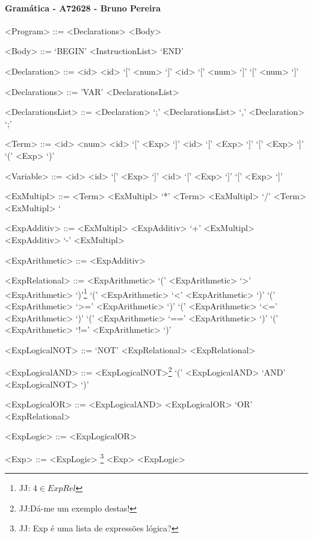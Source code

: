 \documentclass{article}
\begin{document}
\setlength{\grammarparsep}{20pt plus 1pt minus 1pt} %
\setlength{\grammarindent}{10em} %

\paragraph{Gramática - A72628 - Bruno Pereira}
\begin{grammar}

<Program> ::= <Declarations> <Body> 

<Body> ::= `BEGIN' <InstructionList> `END'

<Declaration> ::= <id>
\alt <id> `[' <num> `]'
\alt <id> `[' <num> `]' `[' <num> `]' 

<Declarations> ::= 'VAR' <DeclarationsList>  

<DeclarationsList> ::= <Declaration> `;'
\alt <DeclarationsList> `,' <Declaration> `;'

<Term> ::= <id>
\alt <num>
\alt <id> `[' <Exp> `]'
\alt <id> `[' <Exp> `]' `[' <Exp> `]'
\alt `(' <Exp> `)'

<Variable> ::= <id>
\alt <id> `[' <Exp> `]'
\alt <id> `[' <Exp> `]' `[' <Exp> `]' 
 
<ExMultipl> ::= <Term>
\alt <ExMultipl> `*'  <Term>
\alt <ExMultipl> `/' <Term>
\alt <ExMultipl> `%

<ExpAdditiv> ::= <ExMultipl> 
\alt <ExpAdditiv> `+' <ExMultipl>
\alt <ExpAdditiv> `-' <ExMultipl> 

<ExpArithmetic> ::= <ExpAdditiv> 

<ExpRelational> ::= <ExpArithmetic>             
\alt `(' <ExpArithmetic> `>'  <ExpArithmetic> `)'\footnote{JJ: $4 \in ExpRel$}
\alt `(' <ExpArithmetic> `<'  <ExpArithmetic> `)'
\alt `(' <ExpArithmetic> `>=' <ExpArithmetic> `)'
\alt `(' <ExpArithmetic> `<=' <ExpArithmetic> `)'
\alt `(' <ExpArithmetic> `==' <ExpArithmetic> `)'
\alt `(' <ExpArithmetic> `!=' <ExpArithmetic> `)'

<ExpLogicalNOT> ::= `NOT' <ExpRelational>
\alt <ExpRelational>

<ExpLogicalAND> ::= <ExpLogicalNOT>\footnote{JJ:Dá-me um exemplo destas!}              
\alt `(' <ExpLogicalAND> `AND' <ExpLogicalNOT> `)' 

<ExpLogicalOR> ::= <ExpLogicalAND>
\alt <ExpLogicalOR> `OR' <ExpRelational>  

<ExpLogic> ::= <ExpLogicalOR>

<Exp> ::= <ExpLogic> \footnote{JJ: Exp é uma lista de expressões lógica?}
\alt  <Exp> <ExpLogic> 


\end{grammar}
\end{document}
